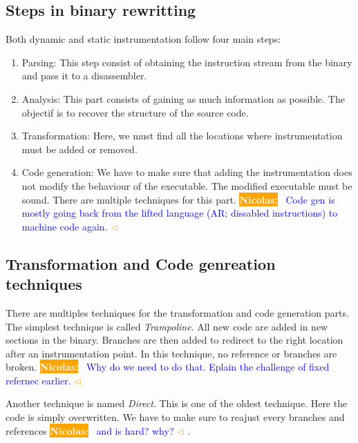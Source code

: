 \documentclass[a4paper,11pt,oneside]{report}
\newcommand{\todobox}[3]{%
    \colorbox{#1}{\textcolor{white}{\sffamily\bfseries\scriptsize #2}}%
    ~\textcolor{blue}{#3} %
    \textcolor{#1}{$\triangleleft$}%
}
\newcommand{\nb}[1]{\todobox{orange}{Nicolas:}{#1}}
\begin{document}
\subsection{Steps in binary rewritting}
Both dynamic and static instrumentation follow four main steps:
\begin{enumerate}
    \item Parsing:
        This step consist of obtaining the instruction stream from the binary
        and pass it to a disassembler.
    \item Analysis:
        This part consists of gaining as much information as possible. The
        objectif is to recover the structure of the source code.
    \item Transformation:
        Here, we must find all the locations where instrumentation must be
        added or removed. 
    \item Code generation:
        We have to make sure that adding the instrumentation does not modify the
        behaviour of the executable. The modified executable must be sound.
        There are multiple techniques for this part. \nb{Code gen is
            mostly going back from the lifted language (AR; dissabled  instructions)
        to machine code again. }
\end{enumerate}
\subsection{Transformation and Code genreation techniques}
There are multiples techniques for the transformation and code generation
parts. The simplest technique is called \textit{Trampoline}. All new code are
added in new sections in the binary. Branches are then added to redirect to the
right location after an instrumentation point. In this technique, no reference
or branches are broken. \nb{Why do we need to do that. Eplain the challenge of
fixed refernec earlier.}

Another technique is named \textit{Direct}. This is one of the oldest
technique. Here the code is simply overwritten. We have to make sure to reajust
every branches and references\nb{and is hard? why?}.
\end{document}
